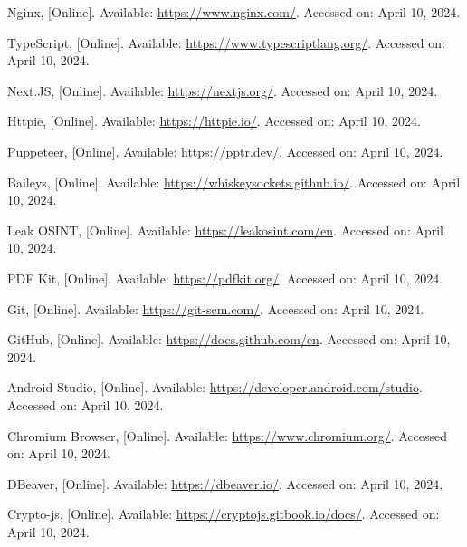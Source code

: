 \begin{thebibliography}{1}
    Nginx, [Online].
    Available: \url{https://www.nginx.com/}.
    Accessed on: April 10, 2024.

    TypeScript, [Online].
    Available: \url{https://www.typescriptlang.org/}.
    Accessed on: April 10, 2024.

    Next.JS, [Online].
    Available: \url{https://nextjs.org/}.
    Accessed on: April 10, 2024.

    Httpie, [Online].
    Available: \url{https://httpie.io/}.
    Accessed on: April 10, 2024.

    Puppeteer, [Online].
    Available: \url{https://pptr.dev/}.
    Accessed on: April 10, 2024.

    Baileys, [Online].
    Available: \url{https://whiskeysockets.github.io/}.
    Accessed on: April 10, 2024.

    Leak OSINT, [Online].
    Available: \url{https://leakosint.com/en}.
    Accessed on: April 10, 2024.

    PDF Kit, [Online].
    Available: \url{https://pdfkit.org/}.
    Accessed on: April 10, 2024.

    Git, [Online].
    Available: \url{https://git-scm.com/}.
    Accessed on: April 10, 2024.
    
    GitHub, [Online].
    Available: \url{https://docs.github.com/en}.
    Accessed on: April 10, 2024.
    
    Android Studio, [Online].
    Available: \url{https://developer.android.com/studio}.
    Accessed on: April 10, 2024.
    
    Chromium Browser, [Online].
    Available: \url{https://www.chromium.org/}.
    Accessed on: April 10, 2024.
    
    DBeaver, [Online].
    Available: \url{https://dbeaver.io/}.
    Accessed on: April 10, 2024.
    
    Crypto-js, [Online].
    Available: \url{https://cryptojs.gitbook.io/docs/}.
    Accessed on: April 10, 2024.
    
\end{thebibliography}